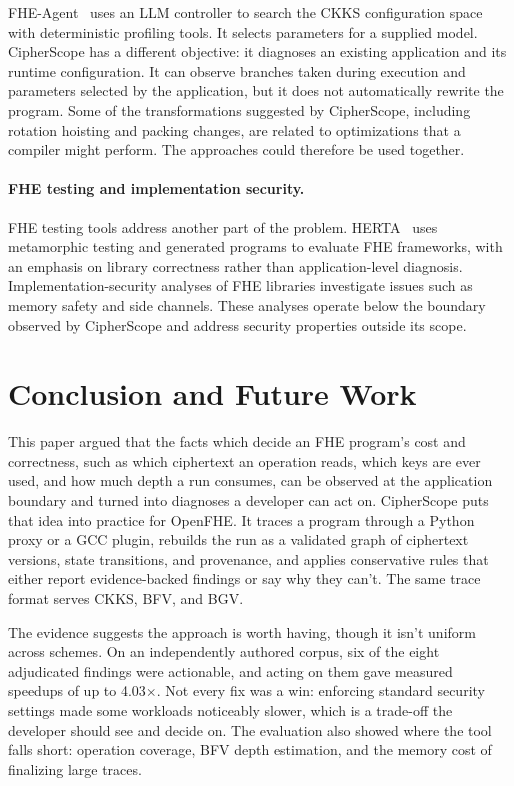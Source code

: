 \documentclass[pdflatex,sn-basic,Numbered,iicol]{sn-jnl}
\begin{document}
FHE-Agent~\cite{fheagent2025} uses an LLM controller to search the CKKS
configuration space with deterministic profiling tools. It selects parameters
for a supplied model. CipherScope has a different objective: it diagnoses an
existing application and its runtime configuration. It can observe branches
taken during execution and parameters selected by the application, but it does
not automatically rewrite the program. Some of the transformations suggested
by CipherScope, including rotation hoisting and packing changes, are related
to optimizations that a compiler might perform. The approaches could
therefore be used together.

\paragraph{FHE testing and implementation security.} FHE testing tools
address another part of the problem. HERTA~\cite{herta2026} uses metamorphic
testing and generated programs to evaluate FHE frameworks, with an emphasis on
library correctness rather than application-level diagnosis.
Implementation-security analyses of FHE libraries investigate issues such as
memory safety and side channels. These analyses operate below the boundary
observed by CipherScope and address security properties outside its scope.

\section{Conclusion and Future Work}
\label{sec:conclusion}

This paper argued that the facts which decide an FHE program's cost and
correctness, such as which ciphertext an operation reads, which keys are ever
used, and how much depth a run consumes, can be observed at the application
boundary and turned into diagnoses a developer can act on. CipherScope puts
that idea into practice for OpenFHE. It traces a program through a Python
proxy or a GCC plugin, rebuilds the run as a validated graph of ciphertext
versions, state transitions, and provenance, and applies conservative rules
that either report evidence-backed findings or say why they can't. The same
trace format serves CKKS, BFV, and BGV.

The evidence suggests the approach is worth having, though it isn't uniform
across schemes. On an independently authored corpus, six of the eight
adjudicated findings were actionable, and acting on them gave measured
speedups of up to 4.03$\times$. Not every fix was a win: enforcing standard
security settings made some workloads noticeably slower, which is a trade-off
the developer should see and decide on. The evaluation also showed where the
tool falls short: operation coverage, BFV depth estimation, and the memory
cost of finalizing large traces.
\end{document}
